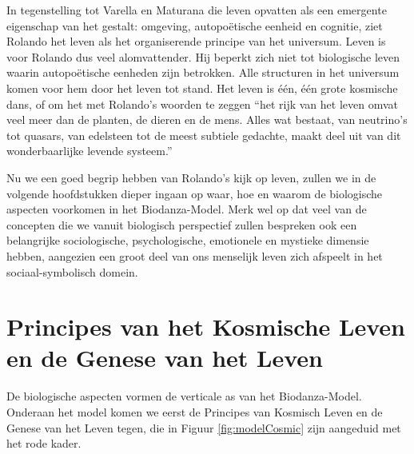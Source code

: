 \documentclass[
  11pt,
]{book}
\begin{document}
In tegenstelling tot Varella en Maturana die leven opvatten als een emergente eigenschap van het gestalt: omgeving, autopoëtische eenheid en cognitie, ziet Rolando het leven als het organiserende principe van het universum. Leven is voor Rolando dus veel alomvattender. Hij beperkt zich niet tot biologische leven waarin autopoëtische eenheden zijn betrokken. Alle structuren in het universum komen voor hem door het leven tot stand. Het leven is één, één grote kosmische dans, of om het met Rolando's woorden te zeggen ``het rijk van het leven omvat veel meer dan de planten, de dieren en de mens. Alles wat bestaat, van neutrino's tot quasars, van edelsteen tot de meest subtiele gedachte, maakt deel uit van dit wonderbaarlijke levende systeem.''

Nu we een goed begrip hebben van Rolando's kijk op leven, zullen we in de volgende hoofdstukken dieper ingaan op waar, hoe en waarom de biologische aspecten voorkomen in het Biodanza-Model. Merk wel op dat veel van de concepten die we vanuit biologisch perspectief zullen bespreken ook een belangrijke sociologische, psychologische, emotionele en mystieke dimensie hebben, aangezien een groot deel van ons menselijk leven zich afspeelt in het sociaal-symbolisch domein.

\hypertarget{principes-van-het-kosmische-leven-en-de-genese-van-het-leven}{%
\chapter{Principes van het Kosmische Leven en de Genese van het Leven}\label{principes-van-het-kosmische-leven-en-de-genese-van-het-leven}}

De biologische aspecten vormen de verticale as van het Biodanza-Model. Onderaan het model komen we eerst de Principes van Kosmisch Leven en de Genese van het Leven tegen, die in Figuur \ref{fig:modelCosmic} zijn aangeduid met het rode kader.
\end{document}

